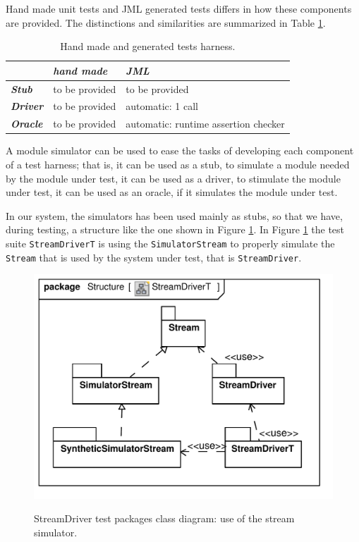 \documentclass{article} \usepackage{times}
\newcommand{\lil}[1]{\texttt{\lstinline|#1|}}
\begin{document}
Hand made unit tests and JML generated tests differs in how these components 
are provided. 
The distinctions and similarities are summarized in Table 
\ref{tab:test_harness}.

\begin{table}[htbp]
\caption{Hand made and generated tests harness.}
\label{tab:test_harness}
\begin{center}
\begin{tabular}{|l|l|l|}\hline
& \textbf{\textit{hand made}} & \textbf{\textit{JML}} \\\hline
\textbf{\textit{Stub}} & to be provided & to be provided\\\hline
\textbf{\textit{Driver}} & to be provided & automatic: 1 call\\\hline
\textbf{\textit{Oracle}} & to be provided & 
automatic: runtime assertion checker\\\hline
\end{tabular}
\end{center}
\end{table}

A module simulator can be used to ease the tasks of developing each component 
of a test harness; that is, it can be used as a stub, to simulate a module 
needed by the module under test, it can be used as a driver, to stimulate the 
module under test, it can be used as an oracle, if it simulates the module 
under test.

In our system, the simulators has been used mainly as stubs, so that we have,
during testing, a structure like the one shown in Figure 
\ref{fig:class_diagram_streamdriver_test}.
In Figure \ref{fig:class_diagram_streamdriver_test} the test suite 
\lil{StreamDriverT} is using the \lil{SimulatorStream} to properly simulate 
the \lil{Stream} that is used by the system under test, that is 
\lil{StreamDriver}.

\begin{figure}[htb!]
 \centering
 \includegraphics[scale=0.4]{UML_model/Class_Diagram__Structure__StreamDriverT}
 \label{fig:class_diagram_streamdriver_test}
 \caption{StreamDriver test packages class diagram: use of the stream simulator.}
\end{figure}
\end{document}
